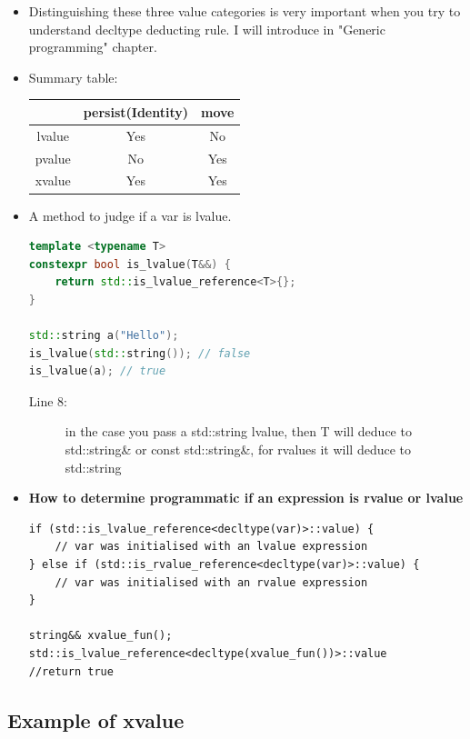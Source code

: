 \documentclass[a4paper,11pt,twoside]{book}
\newcommand{\tophline}{\hline }
\newcommand{\bottomhline}{\\ \hline }
\newcommand{\tophline}{ }
\newcommand{\bottomhline}{ }
\begin{document}
\begin{itemize}
	
	\item Distinguishing these three value categories is very important when you try to understand decltype deducting rule. I will introduce in "Generic programming" chapter.
	
	\item Summary table: 
	\begin{center}
		\begin{tabular}{|c|c|c|}
			\tophline
			& persist(Identity) & move \\
			\tophline
			lvalue & Yes & No \\
			\tophline
			pvalue & No & Yes \\
			\tophline
			xvalue & Yes & Yes \bottomhline
		\end{tabular}
	\end{center}
	



\item A method to judge if a var is lvalue.
\begin{lstlisting}[frame=single, language=c++]
template <typename T>
constexpr bool is_lvalue(T&&) {
	return std::is_lvalue_reference<T>{};
}

std::string a("Hello");
is_lvalue(std::string()); // false
is_lvalue(a); // true  
\end{lstlisting}

\begin{description}
	\item[Line 8:] in the case you pass a std::string lvalue, then T will deduce to std::string\& or const std::string\&, for rvalues it will deduce to std::string
\end{description}

\item \textbf{How to determine programmatic if an expression is rvalue or lvalue}
\begin{lstlisting}[numbers=none]
if (std::is_lvalue_reference<decltype(var)>::value) {
	// var was initialised with an lvalue expression
} else if (std::is_rvalue_reference<decltype(var)>::value) {
	// var was initialised with an rvalue expression
}

string&& xvalue_fun();
std::is_lvalue_reference<decltype(xvalue_fun())>::value
//return true
\end{lstlisting}

\end{itemize}

\subsection{Example of xvalue}
\end{document}
